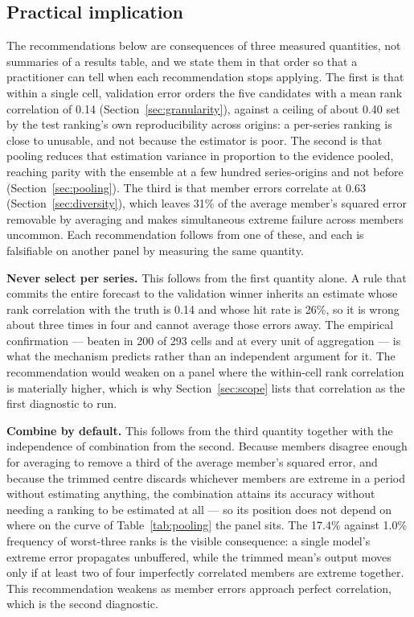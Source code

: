 \documentclass[11pt]{article}
\begin{document}
\subsection{Practical implication}

The recommendations below are consequences of three measured quantities, not summaries of a results table, and we state them in that order so that a practitioner can tell when each recommendation stops applying. The first is that within a single cell, validation error orders the five candidates with a mean rank correlation of 0.14 (Section~\ref{sec:granularity}), against a ceiling of about 0.40 set by the test ranking's own reproducibility across origins: a per-series ranking is close to unusable, and not because the estimator is poor. The second is that pooling reduces that estimation variance in proportion to the evidence pooled, reaching parity with the ensemble at a few hundred series-origins and not before (Section~\ref{sec:pooling}). The third is that member errors correlate at 0.63 (Section~\ref{sec:diversity}), which leaves 31\% of the average member's squared error removable by averaging and makes simultaneous extreme failure across members uncommon. Each recommendation follows from one of these, and each is falsifiable on another panel by measuring the same quantity.

\textbf{Never select per series.} This follows from the first quantity alone. A rule that commits the entire forecast to the validation winner inherits an estimate whose rank correlation with the truth is 0.14 and whose hit rate is 26\%, so it is wrong about three times in four and cannot average those errors away. The empirical confirmation --- beaten in 200 of 293 cells and at every unit of aggregation --- is what the mechanism predicts rather than an independent argument for it. The recommendation would weaken on a panel where the within-cell rank correlation is materially higher, which is why Section~\ref{sec:scope} lists that correlation as the first diagnostic to run.

\textbf{Combine by default.} This follows from the third quantity together with the independence of combination from the second. Because members disagree enough for averaging to remove a third of the average member's squared error, and because the trimmed centre discards whichever members are extreme in a period without estimating anything, the combination attains its accuracy without needing a ranking to be estimated at all --- so its position does not depend on where on the curve of Table~\ref{tab:pooling} the panel sits. The 17.4\% against 1.0\% frequency of worst-three ranks is the visible consequence: a single model's extreme error propagates unbuffered, while the trimmed mean's output moves only if at least two of four imperfectly correlated members are extreme together. This recommendation weakens as member errors approach perfect correlation, which is the second diagnostic.
\end{document}

